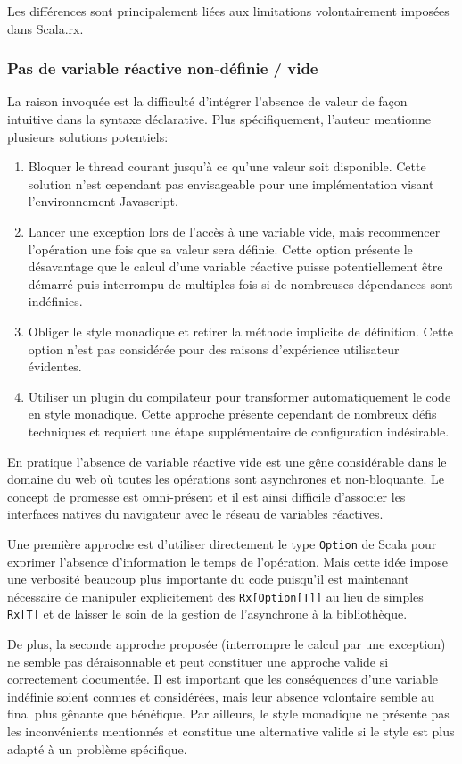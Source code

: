 Les différences sont principalement liées aux limitations volontairement imposées dans Scala.rx.

\subsubsection{Pas de variable réactive non-définie / vide}
La raison invoquée est la difficulté d'intégrer l'absence de valeur de façon intuitive dans la syntaxe déclarative. Plus spécifiquement, l'auteur mentionne plusieurs solutions potentiels:
\begin{enumerate}
	\item Bloquer le thread courant jusqu'à ce qu'une valeur soit disponible. Cette solution n'est cependant pas envisageable pour une implémentation visant l'environnement Javascript.
	\item Lancer une exception lors de l'accès à une variable vide, mais recommencer l'opération une fois que sa valeur sera définie. Cette option présente le désavantage que le calcul d'une variable réactive puisse potentiellement être démarré puis interrompu de multiples fois si de nombreuses dépendances sont indéfinies.
	\item Obliger le style monadique et retirer la méthode implicite de définition. Cette option n'est pas considérée pour des raisons d'expérience utilisateur évidentes.
	\item Utiliser un plugin du compilateur pour transformer automatiquement le code en style monadique. Cette approche présente cependant de nombreux défis techniques et requiert une étape supplémentaire de configuration indésirable.
\end{enumerate}

En pratique l'absence de variable réactive vide est une gêne considérable dans le domaine du web où toutes les opérations sont asynchrones et non-bloquante. Le concept de promesse est omni-présent et il est ainsi difficile d'associer les interfaces natives du navigateur avec le réseau de variables réactives.

Une première approche est d'utiliser directement le type \texttt{Option} de Scala pour exprimer l'absence d'information le temps de l'opération. Mais cette idée impose une verbosité beaucoup plus importante du code puisqu'il est maintenant nécessaire de manipuler explicitement des \texttt{Rx[Option[T]]} au lieu de simples \texttt{Rx[T]} et de laisser le soin de la gestion de l'asynchrone à la bibliothèque.

De plus, la seconde approche proposée (interrompre le calcul par une exception) ne semble pas déraisonnable et peut constituer une approche valide si correctement documentée. Il est important que les conséquences d'une variable indéfinie soient connues et considérées, mais leur absence volontaire semble au final plus gênante que bénéfique. Par ailleurs, le style monadique ne présente pas les inconvénients mentionnés et constitue une alternative valide si le style est plus adapté à un problème spécifique.

